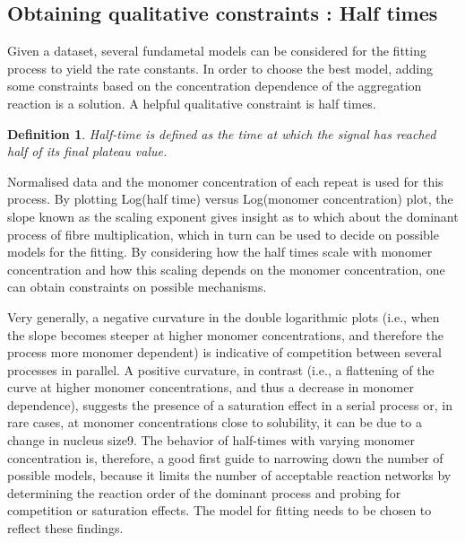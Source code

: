 \documentclass[11pt,a4paper]{article}
\newtheorem{defn}[theorem]{Definition}
\begin{document}
\subsection{Obtaining qualitative constraints : Half times}
Given a dataset, several fundametal models can be considered for the fitting process to yield the rate constants. In order to choose the best model, adding some constraints based on the concentration dependence of the aggregation reaction is a solution. A helpful qualitative constraint is half times.
\begin{defn}{} Half-time is defined as the time at which the signal has reached half of its final plateau value. \end{defn}
Normalised data and the monomer concentration of each repeat is used for this process. By plotting Log(half time) versus Log(monomer concentration) plot, the slope known as the scaling exponent gives insight as to which about the dominant process of fibre multiplication, which in turn can be used to decide on possible models for the fitting. By considering how the half times scale with monomer concentration and how this scaling depends on the monomer concentration, one can obtain constraints on possible mechanisms.

Very generally, a negative curvature in the double logarithmic plots (i.e., when the slope becomes steeper at higher
monomer concentrations, and therefore the process more monomer dependent) is indicative of competition between several
processes in parallel. A positive curvature, in contrast (i.e., a flattening of the curve at higher monomer concentrations, and thus
a decrease in monomer dependence), suggests the presence of a saturation effect in a serial process  or, in rare cases, at monomer concentrations close to solubility, it can be due to a change in nucleus size9. The behavior of half-times with varying monomer concentration is, therefore, a
good first guide to narrowing down the number of possible models, because it limits the number of acceptable reaction networks
by determining the reaction order of the dominant process and probing for competition or saturation effects. The model for fitting needs to be chosen to reflect these findings.
\end{document}
